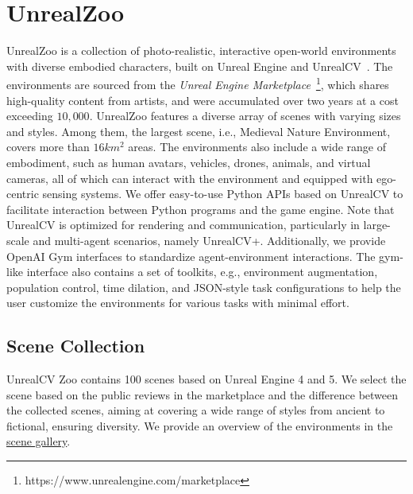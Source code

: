 \documentclass{article}
\begin{document}
\section{UnrealZoo}
\vspace{-0.2cm}
UnrealZoo is a collection of photo-realistic, interactive open-world environments with diverse embodied characters, built on Unreal Engine and UnrealCV~\citep{qiu2017unrealcv}.
The environments are sourced from the \emph{Unreal Engine Marketplace}~\footnote{https://www.unrealengine.com/marketplace}, which shares high-quality content from artists, and were accumulated over two years at a cost exceeding $10,000$.
UnrealZoo features a diverse array of scenes with varying sizes and styles. Among them, the largest scene, i.e., Medieval Nature Environment, covers more than $16 km^2$ areas. 
The environments also include a wide range of embodiment, such as human avatars, vehicles, drones, animals, and virtual cameras, all of which can interact with the environment and equipped with ego-centric sensing systems.
We offer easy-to-use Python APIs based on UnrealCV to facilitate interaction between Python programs and the game engine. 
Note that UnrealCV is optimized for rendering and communication, particularly in large-scale and multi-agent scenarios, namely UnrealCV+.
Additionally, we provide OpenAI Gym interfaces to standardize agent-environment interactions.
The gym-like interface also contains a set of toolkits, e.g., environment augmentation, population control, time dilation, and JSON-style task configurations to help the user customize the environments for various tasks with minimal effort.

\subsection{Scene Collection}

UnrealCV Zoo contains 100 scenes based on Unreal Engine 4 and 5. 
We select the scene based on the public reviews in the marketplace and the difference between the collected scenes, aiming at covering a wide range of styles from ancient to fictional, ensuring diversity. We provide an overview of the environments in the 
\href{https://unrealzoo.notion.site/scene-gallery}{scene gallery}.
\end{document}
